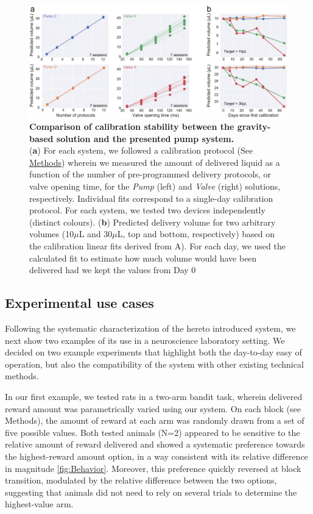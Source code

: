 \begin{figure} 
	\centering
	\includegraphics[width=1.0\linewidth]{Figures/Artboard 2.pdf}
	\caption{\textbf{Comparison of calibration stability between the gravity-based solution and the presented pump system.}\\
		(\textbf{a}) For each system, we followed a calibration protocol (See \hyperref[s:methods]{Methods}) wherein we measured the amount of delivered liquid as a function of the number of pre-programmed delivery protocols, or valve opening time, for the \textit{Pump} (left) and \textit{Valve} (right) solutions, respectively. Individual fits correspond to a single-day calibration protocol. For each system, we tested two devices independently (distinct colours). (\textbf{b}) Predicted delivery volume for two arbitrary volumes (10$\mu$L and 30$\mu$L, top and bottom, respectively) based on the calibration linear fits derived from A). For each day, we used the calculated fit to estimate how much volume would have been delivered had we kept the values from Day 0}
	\label{fig:PumpVsValve} 
\end{figure}


\subsection*{Experimental use cases}

Following the systematic characterization of the hereto introduced system, we next show two examples of its use in a neuroscience laboratory setting. We decided on two example experiments that highlight both the day-to-day easy of operation, but also the compatibility of the system with other existing technical methods.

In our first example, we tested rats in a two-arm bandit task, wherein delivered reward amount was parametrically varied using our system. On each block (see Methods), the amount of reward at each arm was randomly drawn from a set of five possible values. Both tested animals (N=2) appeared to be sensitive to the relative amount of reward delivered and showed a systematic preference towards the highest-reward amount option, in a way consistent with its relative difference in magnitude \ref{fig:Behavior}. Moreover, this preference quickly reversed at block transition, modulated by the relative difference between the two options, suggesting that animals did not need to rely on several trials to determine the highest-value arm.

